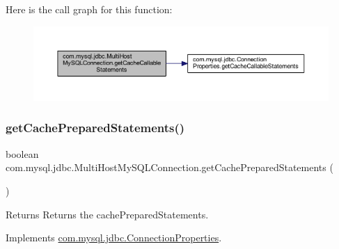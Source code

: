 Here is the call graph for this function\+:
\nopagebreak
\begin{figure}[H]
\begin{center}
\leavevmode
\includegraphics[width=350pt]{classcom_1_1mysql_1_1jdbc_1_1_multi_host_my_s_q_l_connection_a9b0ddb53d65156d1f2866033305d5214_cgraph}
\end{center}
\end{figure}
\mbox{\label{classcom_1_1mysql_1_1jdbc_1_1_multi_host_my_s_q_l_connection_a2f3e7980f5e4eaaa44c0235a6124ec81}} 
\subsubsection{\texorpdfstring{get\+Cache\+Prepared\+Statements()}{getCachePreparedStatements()}}
{\footnotesize\ttfamily boolean com.\+mysql.\+jdbc.\+Multi\+Host\+My\+S\+Q\+L\+Connection.\+get\+Cache\+Prepared\+Statements (\begin{DoxyParamCaption}{ }\end{DoxyParamCaption})}

\begin{DoxyReturn}{Returns}
Returns the cache\+Prepared\+Statements. 
\end{DoxyReturn}


Implements \mbox{\hyperlink{interfacecom_1_1mysql_1_1jdbc_1_1_connection_properties_a74f3ae7b24eeb5ed44da99c60f664ac4}{com.\+mysql.\+jdbc.\+Connection\+Properties}}.

